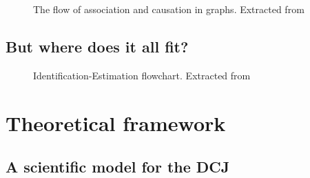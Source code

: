 \documentclass[
  authoryear,
  preprint,
  1p]{elsarticle}
\begin{document}
\begin{figure}


\caption{\label{fig-ACflow}The flow of association and causation in
graphs. Extracted from \citet[31]{Neal_2020}}

\end{figure}%

\subsection{But where does it all fit?}\label{sec-background-where}

\begin{figure}


\caption{\label{fig-IEflow}Identification-Estimation flowchart.
Extracted from \citet[32]{Neal_2020}}

\end{figure}%

\section{Theoretical framework}\label{sec-theory}

\subsection{A scientific model for the DCJ}\label{sec-theory-scientific}
\end{document}
